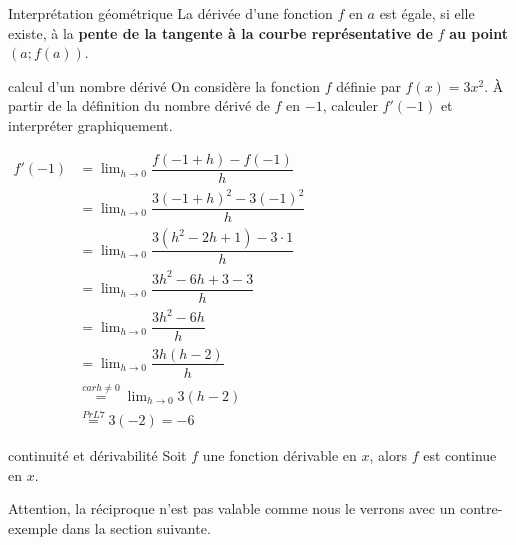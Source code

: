 \documentclass[a4paper,12pt]{article}
\begin{document}
\begin{remarque}
Interprétation géométrique
\tcblower
La dérivée d'une fonction $f$ en $a$ est égale, si elle existe, à la \textbf{pente de la tangente à la courbe représentative de} $f$ \textbf{au point} $(a;f(a))$.
\end{remarque}
\begin{exemple}
	calcul d'un nombre dérivé
	\tcblower
On considère la fonction $f$ définie par $f(x) = 3x^2$. À partir de la définition du nombre dérivé de $f$ en $-1$, calculer $f'(-1)$ et interpréter graphiquement.

$
\begin{aligned}
f'(-1) &= \displaystyle\lim_{h \to 0} \dfrac{f(-1 + h) - f(-1)}{h}\\
&= \displaystyle\lim_{h \to 0} \dfrac{3(-1 + h)^2 - 3(-1)^2}{h}\\
&= \displaystyle\lim_{h \to 0} \dfrac{3(h^2 - 2h + 1) - 3 \cdot 1}{h}\\
&= \displaystyle\lim_{h \to 0} \dfrac{3h^2 - 6h + 3 - 3}{h}\\
&= \displaystyle\lim_{h \to 0} \dfrac{3h^2 - 6h}{h}\\
&= \displaystyle\lim_{h \to 0} \dfrac{3h(h - 2)}{h}\\
&\stackrel{car h \neq 0}{=} \displaystyle\lim_{h \to 0} 3(h - 2)\\
&\stackrel{PrL 7}{=} 3(-2) = -6
\end{aligned}
$
\end{exemple}
\begin{thm}
	continuité et dérivabilité
	\tcblower
	Soit $f$ une fonction dérivable en $x$, alors $f$ est continue en $x$.
\end{thm}
\begin{remarque}
	\tcblower
	Attention, la réciproque n'est pas valable comme nous le verrons avec un contre-exemple dans la section suivante. 
\end{remarque}
\end{document}
